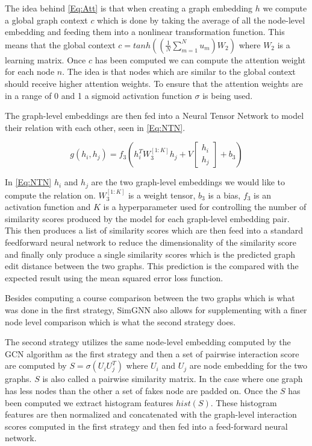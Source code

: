 The idea behind \autoref{Eq:Att} is that when creating a graph embedding $h$ we compute a global graph context $c$ which is done by taking the average of all the node-level embedding and feeding them into a nonlinear transformation function. This means that the global context $c=tanh((\frac{1}{N}\sum_{m=1}^Nu_m)W_2)$ where $W_2$ is a learning matrix. Once $c$ has been computed we can compute the attention weight for each node $n$. The idea is that nodes which are similar to the global context should receive higher attention weights. To ensure that the attention weights are in a range of 0 and 1 a sigmoid activation function $\sigma$ is being used\cite{Bai2018}.


The graph-level embeddings are then fed into a Neural Tensor Network to model their relation with each other, seen in \autoref{Eq:NTN}.


\begin{equation}\label{Eq:NTN}
g(h_i,h_j) = f_3(h_i^TW_3^{[1:K]}h_j+V\begin{bmatrix}h_i \\ h_j \end{bmatrix} + b_3)
\end{equation}

In \autoref{Eq:NTN} $h_i$ and $h_j$ are the two graph-level embeddings we would like to compute the relation on. $W_3^{[1:K]}$ is a weight tensor, $b_3$ is a bias,  $f_3$ is an activation function and $K$ is a hyperparameter used for controlling the number of similarity scores produced by the model for each graph-level embedding pair\cite{Bai2018}. This then produces a list of similarity scores which are then feed into a standard feedforward neural network to reduce the dimensionality of the similarity score and finally only produce a single similarity scores which is the predicted graph edit distance between the two graphs. This prediction is the compared with the expected result using the mean squared error loss function\cite{Bai2018}.


Besides computing a course comparison between the two graphs which is what was done in the first strategy, SimGNN also allows for supplementing with a finer node level comparison which is what the second strategy does.

The second strategy utilizes the same node-level embedding computed by the GCN algorithm as the first strategy and then a set of pairwise interaction score are computed by $S = \sigma(U_iU_j^T)$ where $U_i$ and $U_j$ are node embedding for the two graphs. $S$ is also called a pairwise similarity matrix. In the case where one graph has less nodes than the other a set of fakes node are padded on. Once the $S$ has been computed we extract histogram features $hist(S)$. These histogram features are then normalized and concatenated with the graph-level interaction scores computed in the first strategy and then fed into a feed-forward neural network\cite{Bai2018}.






